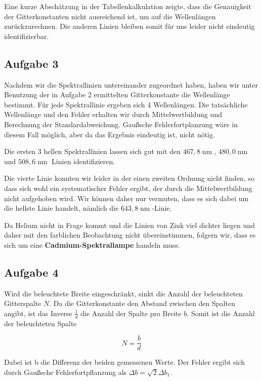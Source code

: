 \documentclass[a4paper,german,12pt,smallheadings]{scrartcl}
\begin{document}
Eine kurze Abschätzung in der Tabellenkalkulation zeigte, dass die Genauigkeit
der Gitterkonstanten nicht ausreichend ist, um auf die Wellenlängen
zurückzurechnen. Die anderen Linien bleiben somit für uns leider nicht
eindeutig identifizierbar.

\subsection{Aufgabe 3}

Nachdem wir die Spektrallinien untereinander zugeordnet haben, haben wir unter
Benutzung der in Aufgabe 2 ermittelten Gitterkonstante die Wellenlänge
bestimmt. Für jede Spektrallinie ergeben sich 4 Wellenlängen. Die tatsächliche
Wellenlänge und den Fehler erhalten wir durch Mittelwertbildung und Berechnung
der Standardabweichung. Gaußsche Fehlerfortplanzung wäre in diesem Fall
möglich, aber da das Ergebnis eindeutig ist, nicht nötig.

Die ersten 3 hellen Spektrallinien lassen sich gut mit den $467{,}8
\operatorname{nm}$, $480{,}0 \operatorname{nm}$ und $508{,}6 \operatorname{nm}$
Linien identifizieren.

Die vierte Linie konnten wir leider in der einen zweiten Ordnung nicht finden,
so dass sich wohl ein systematischer Fehler ergibt, der durch die
Mittelwertbildung nicht aufgehoben wird. Wir können daher nur vermuten, dass es
sich dabei um die hellste Linie handelt, nämlich die $643{,}8
\operatorname{nm}$-Linie.

Da Helium nicht in Frage kommt und die Linien von Zink viel dichter liegen und
daher mit den farblichen Beobachtung nicht übereinstimmen, folgern wir, dass es
sich um eine \textbf{Cadmium-Spektrallampe} handeln muss.

\subsection{Aufgabe 4}

Wird die beleuchtete Breite eingeschränkt, sinkt die Anzahl der beleuchteten
Gitterspalte $N$. Da die Gitterkonstante den Abstand zwischen den Spalten
angibt, ist das Inverse $\frac{1}{d}$ die Anzahl der Spalte pro Breite $b$.
Somit ist die Anzahl der beleuchteten Spalte

\begin{equation}
  N = \frac{b}{d}
\end{equation}

Dabei ist b die Differenz der beiden gemessenen Werte. Der Fehler ergibt sich
durch Gaußsche Fehlerfortpflanzung als $\Delta b = \sqrt{2} \Delta b_1$.
\end{document}
